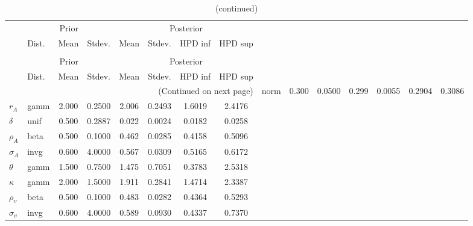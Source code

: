  
\begin{center}
\begin{longtable}{llcccccc} 
\caption{Results from Metropolis-Hastings (parameters)}
 \label{Table:MHPosterior:1}\\
\toprule 
  & \multicolumn{3}{c}{Prior}  &  \multicolumn{4}{c}{Posterior} \\
  \cmidrule(r{.75em}){2-4} \cmidrule(r{.75em}){5-8}
  & Dist. & Mean  & Stdev. & Mean & Stdev. & HPD inf & HPD sup\\
\midrule \endfirsthead 
\caption{(continued)}\\\toprule 
  & \multicolumn{3}{c}{Prior}  &  \multicolumn{4}{c}{Posterior} \\
  \cmidrule(r{.75em}){2-4} \cmidrule(r{.75em}){5-8}
  & Dist. & Mean  & Stdev. & Mean & Stdev. & HPD inf & HPD sup\\
\midrule \endhead 
\bottomrule \multicolumn{8}{r}{(Continued on next page)} \endfoot 
\bottomrule \endlastfoot 
${\alpha}$ & norm &   0.300 & 0.0500 &   0.299& 0.0055 &  0.2904 &  0.3086 \\ 
${r_{A}}$ & gamm &   2.000 & 0.2500 &   2.006& 0.2493 &  1.6019 &  2.4176 \\ 
${\delta}$ & unif &   0.500 & 0.2887 &   0.022& 0.0024 &  0.0182 &  0.0258 \\ 
${\rho_A}$ & beta &   0.500 & 0.1000 &   0.462& 0.0285 &  0.4158 &  0.5096 \\ 
${\sigma_A}$ & invg &   0.600 & 4.0000 &   0.567& 0.0309 &  0.5165 &  0.6172 \\ 
${\theta}$ & gamm &   1.500 & 0.7500 &   1.475& 0.7051 &  0.3783 &  2.5318 \\ 
${\kappa}$ & gamm &   2.000 & 1.5000 &   1.911& 0.2841 &  1.4714 &  2.3387 \\ 
${\rho_\upsilon}$ & beta &   0.500 & 0.1000 &   0.483& 0.0282 &  0.4364 &  0.5293 \\ 
${\sigma_\upsilon}$ & invg &   0.600 & 4.0000 &   0.589& 0.0930 &  0.4337 &  0.7370 \\ 
\end{longtable}
 \end{center}
